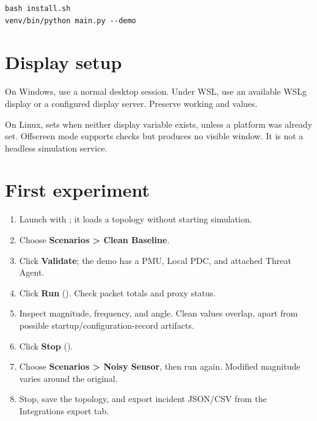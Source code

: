 \par\noindent\begin{minipage}{\linewidth}
\begin{lstlisting}[title={BASH}]
bash install.sh
venv/bin/python main.py --demo
\end{lstlisting}
\end{minipage}\par
{}
\section*{Display setup}
On Windows, use a normal desktop session. Under WSL, use an available WSLg display or a configured display server. Preserve working  and  values.

On Linux,  sets  when neither display variable exists, unless a platform was already set. Offscreen mode supports checks but produces no visible window. It is not a headless simulation service.

\section*{First experiment}
\begin{enumerate}
\item Launch with ; it loads a topology without starting simulation.
\item Choose \textbf{Scenarios  >  Clean Baseline}.
\item Click \textbf{Validate}; the demo has a PMU, Local PDC, and attached Threat Agent.
\item Click \textbf{Run} (). Check packet totals and proxy status.
\item Inspect magnitude, frequency, and angle. Clean values overlap, apart from possible startup/configuration-record artifacts.
\item Click \textbf{Stop} ().
\item Choose \textbf{Scenarios  >  Noisy Sensor}, then run again. Modified magnitude varies around the original.
\item Stop, save the topology, and export incident JSON/CSV from the Integrations export tab.
\end{enumerate}

